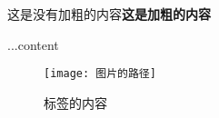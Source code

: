 这是没有加粗的内容\textbf{这是加粗的内容}
\textwidth

\begin{command}[option]
    ...content
\end{command}
\begin{figure}[H]
    \centering
    \texttt{[image: 图片的路径]}
    \caption{标签的内容}
    \label{Label的内容}
\end{figure}